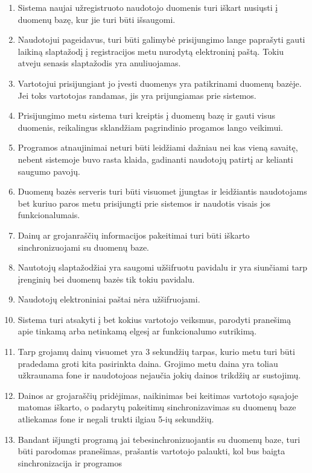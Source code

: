 \documentclass{VUMIFPSkursinis}
\begin{document}
\begin{enumerate}[start=1,label={\bfseries NFR\arabic*}]
\item Sistema naujai užregistruoto naudotojo duomenis turi iškart nusiųsti į duomenų bazę, kur jie turi būti išsaugomi.
\item Naudotojui pageidavus, turi būti galimybė prisijungimo lange paprašyti gauti laikiną slaptažodį į registracijos metu nurodytą elektroninį paštą. Tokiu atveju senasis slaptažodis yra anuliuojamas.
\item Vartotojui prisijungiant jo įvesti duomenys yra patikrinami duomenų bazėje. Jei toks vartotojas randamas, jis yra prijungiamas prie sistemos.
\item Prisijungimo metu sistema turi kreiptis į duomenų bazę ir gauti visus duomenis, reikalingus sklandžiam pagrindinio progamos lango veikimui.
\item Programos atnaujinimai neturi būti leidžiami dažniau nei kas vieną savaitę, nebent sistemoje buvo rasta klaida, gadinanti naudotojų patirtį ar kelianti saugumo pavojų.
\item Duomenų bazės serveris turi būti visuomet įjungtas ir leidžiantis naudotojams bet kuriuo paros metu prisijungti prie sistemos ir naudotis visais jos funkcionalumais. 
\item Dainų ar grojanraščių informacijos pakeitimai turi būti iškarto sinchronizuojami su duomenų baze.
\item Nautotojų slaptažodžiai yra saugomi užšifruotu pavidalu ir yra siunčiami tarp įrenginių bei duomenų bazės tik tokiu pavidalu.
\item Naudotojų elektroniniai paštai nėra užšifruojami.
\item Sistema turi atsakyti į bet kokius vartotojo veiksmus, parodyti pranešimą apie tinkamą arba netinkamą elgesį ar funkcionalumo sutrikimą. 
\item Tarp grojamų dainų visuomet yra 3 sekundžių tarpas, kurio metu turi būti pradedama groti kita pasirinkta daina. Grojimo metu daina yra toliau užkraunama fone ir naudotojoas 
nejaučia jokių dainos trikdžių ar sustojimų.
\item Dainos ar grojaraščių pridėjimas, naikinimas bei keitimas vartotojo sąsajoje matomas iškarto, o padarytų pakeitimų sinchronizavimas su duomenų baze atliekamas fone ir 
negali trukti ilgiau 5-ių sekundžių.
\item Bandant išjungti programą jai tebesinchronizuojantis su duomenų baze, turi būti parodomas pranešimas, prašantis vartotojo palaukti, kol bus baigta sinchronizacija ir programos 

\end{enumerate}
\end{document}
